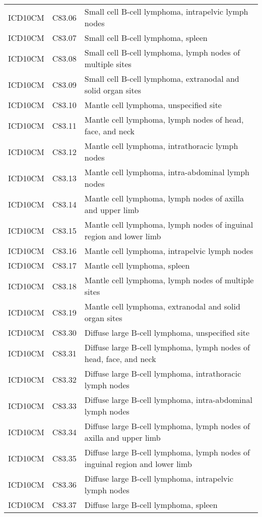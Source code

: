 \begin{longtable}{p{}p{}p{}}
  ICD10CM & C83.06 & Small cell B-cell lymphoma, intrapelvic lymph nodes \\ 
  ICD10CM & C83.07 & Small cell B-cell lymphoma, spleen \\ 
  ICD10CM & C83.08 & Small cell B-cell lymphoma, lymph nodes of multiple sites \\ 
  ICD10CM & C83.09 & Small cell B-cell lymphoma, extranodal and solid organ sites \\ 
  ICD10CM & C83.10 & Mantle cell lymphoma, unspecified site \\ 
  ICD10CM & C83.11 & Mantle cell lymphoma, lymph nodes of head, face, and neck \\ 
  ICD10CM & C83.12 & Mantle cell lymphoma, intrathoracic lymph nodes \\ 
  ICD10CM & C83.13 & Mantle cell lymphoma, intra-abdominal lymph nodes \\ 
  ICD10CM & C83.14 & Mantle cell lymphoma, lymph nodes of axilla and upper limb \\ 
  ICD10CM & C83.15 & Mantle cell lymphoma, lymph nodes of inguinal region and lower limb \\ 
  ICD10CM & C83.16 & Mantle cell lymphoma, intrapelvic lymph nodes \\ 
  ICD10CM & C83.17 & Mantle cell lymphoma, spleen \\ 
  ICD10CM & C83.18 & Mantle cell lymphoma, lymph nodes of multiple sites \\ 
  ICD10CM & C83.19 & Mantle cell lymphoma, extranodal and solid organ sites \\ 
  ICD10CM & C83.30 & Diffuse large B-cell lymphoma, unspecified site \\ 
  ICD10CM & C83.31 & Diffuse large B-cell lymphoma, lymph nodes of head, face, and neck \\ 
  ICD10CM & C83.32 & Diffuse large B-cell lymphoma, intrathoracic lymph nodes \\ 
  ICD10CM & C83.33 & Diffuse large B-cell lymphoma, intra-abdominal lymph nodes \\ 
  ICD10CM & C83.34 & Diffuse large B-cell lymphoma, lymph nodes of axilla and upper limb \\ 
  ICD10CM & C83.35 & Diffuse large B-cell lymphoma, lymph nodes of inguinal region and lower limb \\ 
  ICD10CM & C83.36 & Diffuse large B-cell lymphoma, intrapelvic lymph nodes \\ 
  ICD10CM & C83.37 & Diffuse large B-cell lymphoma, spleen \\ 

\end{longtable}
